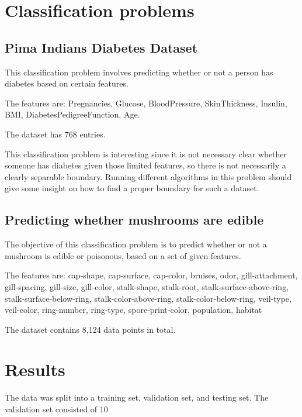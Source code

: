 \documentclass[11pt]{article}
\begin{document}
        \section{Classification problems}
            \subsection{Pima Indians Diabetes Dataset}

            This classification problem involves predicting whether or not a person has diabetes
            based on certain features.

            The features are: Pregnancies, Glucose, BloodPressure, SkinThickness, Insulin, BMI, DiabetesPedigreeFunction, Age.

            The dataset has 768 entries.

            This classification problem is interesting since it is not necessary
            clear whether someone has diabetes given those limited features, so there
            is not necessarily a clearly separable boundary. Running different algorithms
            in this problem should give some insight on how to find a proper boundary for
            such a dataset.

            \subsection{Predicting whether mushrooms are edible}

            The objective of this classification problem is to predict
            whether or not a mushroom is edible or poisonous, based on a set
            of given features.

            The features are: cap-shape, cap-surface, cap-color, bruises, odor, gill-attachment, gill-spacing, gill-size, gill-color, stalk-shape, stalk-root, stalk-surface-above-ring, stalk-surface-below-ring, stalk-color-above-ring, stalk-color-below-ring, veil-type, veil-color, ring-number, ring-type, spore-print-color, population, habitat

            The dataset contains 8,124 data points in total.


        
        \section{Results}

        The data was split into a training set, validation set, and testing set. The validation set consisted of 10%
\end{document}
